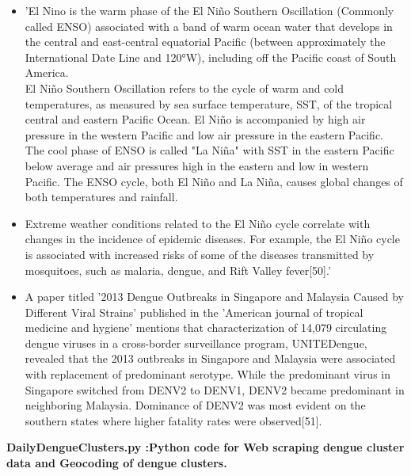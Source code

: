\documentclass[11pt]{exam}
\begin{document}
\begin{questions}
\begin{enumerate}
\begin{itemize}
\item 'El Nino is the warm phase of the El Niño Southern Oscillation (Commonly called ENSO) associated with a band of warm ocean water that develops in the central and east-central equatorial Pacific  (between approximately the International Date Line and 120°W), including off the Pacific coast of South America. \\
El Niño Southern Oscillation refers to the cycle of warm and cold temperatures, as measured by sea surface temperature, SST, of the tropical central and eastern Pacific Ocean. El Niño is accompanied by high air pressure in the western Pacific and low air pressure in the eastern Pacific. The cool phase of ENSO is called "La Niña" with SST in the eastern Pacific below average and air pressures high in the eastern and low in western Pacific. The ENSO cycle, both El Niño and La Niña, causes global changes of both temperatures and rainfall. \\
\item Extreme weather conditions related to the El Niño cycle correlate with changes in the incidence of epidemic diseases. For example, the El Niño cycle is associated with increased risks of some of the diseases transmitted by mosquitoes, such as malaria, dengue, and Rift Valley fever[50].' \\
\item A paper titled '2013 Dengue Outbreaks in Singapore and Malaysia Caused by Different Viral Strains' published in the 'American journal of tropical medicine and hygiene' mentions that characterization of 14,079 circulating dengue viruses in a cross-border surveillance program, UNITEDengue, revealed that the 2013 outbreaks in Singapore and Malaysia were associated with replacement of predominant serotype. While the predominant virus in Singapore switched from DENV2 to DENV1, DENV2 became predominant in neighboring Malaysia. Dominance of DENV2 was most evident on the southern states where higher fatality rates were observed[51].
\end{itemize}

\end{enumerate}


\newpage
\textbf{DailyDengueClusters.py :Python code for Web scraping dengue cluster data and Geocoding of dengue clusters.}
\color{blue}
\begin{lstlisting}


\end{lstlisting}
\end{questions}
\end{document}
